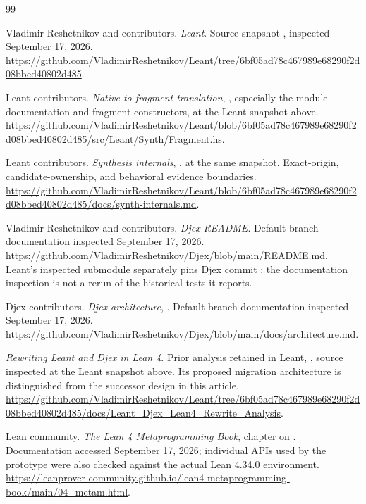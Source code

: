 \clearpage
\begin{thebibliography}{99}
\raggedright
{}
 Vladimir Reshetnikov and contributors.
\emph{Leant}. Source snapshot , inspected September 17, 2026.
\url{https://github.com/VladimirReshetnikov/Leant/tree/6bf05ad78c467989e68290f2d08bbed40802d485}.

 Leant contributors.
\emph{Native-to-fragment translation}, , especially the module documentation and fragment constructors, at the Leant snapshot above.
\url{https://github.com/VladimirReshetnikov/Leant/blob/6bf05ad78c467989e68290f2d08bbed40802d485/src/Leant/Synth/Fragment.hs}.

 Leant contributors.
\emph{Synthesis internals}, , at the same snapshot. Exact-origin, candidate-ownership, and behavioral evidence boundaries.
\url{https://github.com/VladimirReshetnikov/Leant/blob/6bf05ad78c467989e68290f2d08bbed40802d485/docs/synth-internals.md}.

 Vladimir Reshetnikov and contributors.
\emph{Djex README}. Default-branch documentation inspected September 17, 2026.
\url{https://github.com/VladimirReshetnikov/Djex/blob/main/README.md}.
Leant's inspected submodule separately pins Djex commit ; the documentation inspection is not a rerun of the historical tests it reports.

 Djex contributors.
\emph{Djex architecture}, . Default-branch documentation inspected September 17, 2026.
\url{https://github.com/VladimirReshetnikov/Djex/blob/main/docs/architecture.md}.

 \emph{Rewriting Leant and Djex in Lean 4}.
Prior analysis retained in Leant, , source inspected at the Leant snapshot above. Its proposed migration architecture is distinguished from the successor design in this article.
\url{https://github.com/VladimirReshetnikov/Leant/tree/6bf05ad78c467989e68290f2d08bbed40802d485/docs/Leant_Djex_Lean4_Rewrite_Analysis}.

 Lean community.
\emph{The Lean 4 Metaprogramming Book}, chapter on . Documentation accessed September 17, 2026; individual APIs used by the prototype were also checked against the actual Lean 4.34.0 environment.
\url{https://leanprover-community.github.io/lean4-metaprogramming-book/main/04_metam.html}.


\end{thebibliography}
